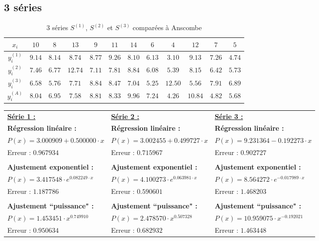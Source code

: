 \documentclass{report}
\begin{document}
      \subsection{3 séries}
	\begin{table}[h]
	  \centering
	  \begin{tabular}{| c | c | c | c | c | c | c | c | c | c | c | c |}
	    \hline 
	    $x_{i}$ & $10$ & $8$ & $13$ & $9$ & $11$ & $14$ & $6$ & $4$ & $12$ & $7$ & $5$ \\ 
	    \hline 
	    $y^{(1)}_{i}$ & $9.14$ & $8.14$ & $8.74$ & $8.77$ & $9.26$ & $8.10$ & $6.13$ & $3.10$ & $9.13$ & $7.26$ & $4.74$ \\ %
	    \hline 
	    $y^{(2)}_{i}$ & $7.46$ & $6.77$ & $12.74$ & $7.11$ & $7.81$ & $8.84$ & $6.08$ & $5.39$ & $8.15$ & $6.42$ & $5.73$ \\ %
	    \hline 
	    $y^{(3)}_{i}$ & $6.58$ & $5.76$ & $7.71$ & $8.84$ & $8.47$ & $7.04$ & $5.25$ & $12.50$ & $5.56$ & $7.91$ & $6.89$ \\ %
	    \hline 
	    $y^{(A)}_{i}$ & $8.04$ & $6.95$ & $7.58$ & $8.81$ & $8.33$ & $9.96$ & $7.24$ & $4.26$ & $10.84$ & $4.82$ & $5.68$ \\ %
	    \hline 
	  \end{tabular}
	  \caption{3 séries $S^{(1)}$, $S^{(2)}$ et $S^{(3)}$ comparées à Anscombe}
	  \label{approx_tp2_ex2}
	\end{table}
	\begin{tabular}{l | l | l}
	  \noindent \underline{\textbf{Série 1 :}}  & \noindent\underline{\textbf{Série 2 :}} & \noindent\underline{\textbf{Série 3 :}} \\
	  \textbf{Régression linéaire : } & \textbf{Régression linéaire : } & \textbf{Régression linéaire : } \\
	  $P(x) = 3.000909 + 0.500000 \cdot x$ & $P(x) = 3.002455 + 0.499727 \cdot x$ & $P(x) = 9.231364 - 0.192273 \cdot x $\\
	  Erreur : $0.967934$ & Erreur : $0.715967$ & Erreur : $0.902727$ \\
	  & &\\
	  \textbf{Ajustement exponentiel : } & \textbf{Ajustement exponentiel : } & \textbf{Ajustement exponentiel : } \\
	  $P(x) = 3.417548 \cdot e^{0.082249 \cdot x}$ & $P(x) = 4.100273 \cdot e^{0.063981 \cdot x}$ & $P(x) = 8.564272 \cdot e^{-0.017989\cdot x}$\\
	  Erreur : $1.187786$ & Erreur : $0.590601$ & Erreur : $1.468203$\\
	  & & \\
	  \textbf{Ajustement ``puissance" : } & \textbf{Ajustement ``puissance" : } & \textbf{Ajustement ``puissance" : } \\
	  $P(x) = 1.453451 \cdot x^{0.749910}$ & $P(x) = 2.478570 \cdot x^{0.507328}$ & $P(x) = 10.959075\cdot x^{-0.192021}$ \\
	  Erreur : $0.950634$ & Erreur : $0.682932$ & Erreur : $1.463448$ \\
	  
	\end{tabular}
	\vspace{1cm}
	
\end{document}
